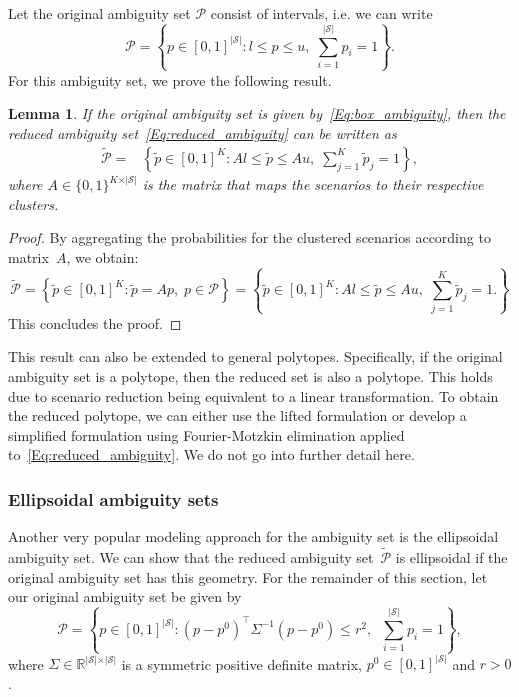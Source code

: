 \documentclass{article}
\newtheorem{lemma}[theorem]{Lemma}
\newcommand{\mP}{\mathcal{P}}
\newcommand{\mS}{\mathcal{S}}
\newcommand{\tP}{\tilde{\mP}}
\begin{document}
Let the original ambiguity set \(\mP\) consist of intervals, i.e. we can write
\begin{equation}
	\mP=\left\{p\in [0,1]^{|\mS|} : l \leq p \leq u,\; \textstyle\sum_{i=1}^{|\mS|} p_i=1\right\}. \label{Eq:box_ambiguity}
\end{equation}
For this ambiguity set, we prove the following result.
\begin{lemma}
	If the original ambiguity set is given by~\eqref{Eq:box_ambiguity}, then the reduced ambiguity set~\eqref{Eq:reduced_ambiguity} can be written as
	\begin{equation}
		\label{def:reduced_ambiguity_set}
		\begin{aligned}
			\tilde{\mP}
			=& \left\{\tilde{p} \in  [0,1]^{K}  : Al \leq \tilde{p} \leq Au,\; \textstyle\sum_{j=1}^{K}  \tilde{p}_j=1\right\},
		\end{aligned}
	\end{equation}
	where $A \in \{0, 1\}^{K \times \vert \mS \vert}$ is the matrix that maps the scenarios to their respective clusters.
\end{lemma}
\begin{proof} By aggregating the probabilities for the clustered scenarios according to matrix~$A$, we obtain:
	\begin{equation*}
		\tilde{\mP}
		= \left\{\tilde{p}\in[0,1]^{K} :\tilde{p} = Ap,\; p\in\mP\right\}
		= \left\{\tilde{p} \in  [0,1]^{K}  : Al \leq \tilde{p} \leq Au,\; \textstyle\sum_{j=1}^{K}  \tilde{p}_j=1.\right\}
	\end{equation*}
	This concludes the proof.
\end{proof}

This result can also be extended to general polytopes.%
Specifically, if the original ambiguity set is a polytope, then the reduced set is also a polytope.
This holds due to scenario reduction being equivalent to a linear transformation.
To obtain the reduced polytope, we can either use the lifted formulation or develop a simplified formulation using Fourier-Motzkin elimination applied to~\eqref{Eq:reduced_ambiguity}.
We do not go into further detail here.

\subsubsection{Ellipsoidal ambiguity sets}\label{Sec:ellipsoidal}
Another very popular modeling approach for the ambiguity set is the ellipsoidal ambiguity set. 
We can show that the reduced ambiguity set~$\tP$ is ellipsoidal if the original ambiguity set has this geometry.
For the remainder of this section, let our original ambiguity set be given by 
\[
\mP=\left\{p\in [0,1]^{|\mS|} : (p - p^0)^{\top}\Sigma^{-1}(p - p^0) \leq r^2,\;\; \textstyle\sum_{i=1}^{|\mS|} p_i=1\right\},
\]
where $\Sigma \in \mathbb{R}^{\vert \mS \vert \times \vert \mS \vert}$ is a symmetric positive definite matrix, $p^0 \in [0,1]^{\vert \mS \vert}$ and $r > 0$.
\end{document}
